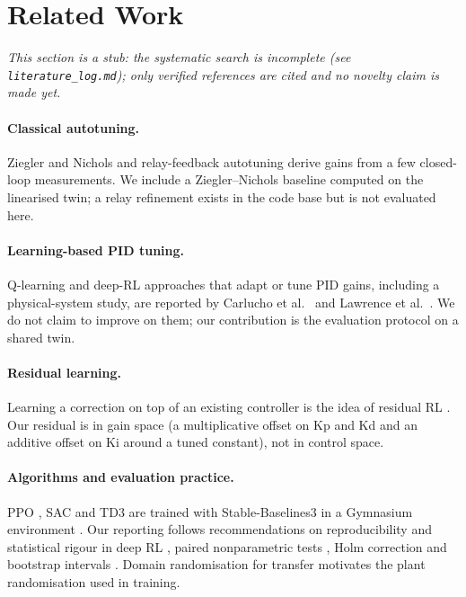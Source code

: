 \section{Related Work}
\emph{This section is a stub: the systematic search is incomplete (see \texttt{literature\_log.md}); only verified references are cited and no novelty claim is made yet.}

\paragraph*{Classical autotuning.} Ziegler and Nichols \cite{ziegler1942optimum} and relay-feedback autotuning \cite{astrom1984relay} derive gains from a few closed-loop measurements. We include a Ziegler--Nichols baseline computed on the linearised twin; a relay refinement exists in the code base but is not evaluated here.

\paragraph*{Learning-based PID tuning.} Q-learning and deep-RL approaches that adapt or tune PID gains, including a physical-system study, are reported by Carlucho et al.\ \cite{carlucho2017incremental} and Lawrence et al.\ \cite{lawrence2021shallow}. We do not claim to improve on them; our contribution is the evaluation protocol on a shared twin.

\paragraph*{Residual learning.} Learning a correction on top of an existing controller is the idea of residual RL \cite{johannink2019residual,silver2018residual}. Our residual is in gain space (a multiplicative offset on Kp and Kd and an additive offset on Ki around a tuned constant), not in control space.

\paragraph*{Algorithms and evaluation practice.} PPO \cite{schulman2017ppo}, SAC \cite{haarnoja2018sac} and TD3 \cite{fujimoto2018td3} are trained with Stable-Baselines3 \cite{raffin2021sb3} in a Gymnasium environment \cite{towers2024gymnasium}. Our reporting follows recommendations on reproducibility and statistical rigour in deep RL \cite{henderson2018matters,agarwal2021precipice}, paired nonparametric tests \cite{wilcoxon1945individual}, Holm correction \cite{holm1979simple} and bootstrap intervals \cite{efron1979bootstrap}. Domain randomisation for transfer \cite{tobin2017domain} motivates the plant randomisation used in training.
